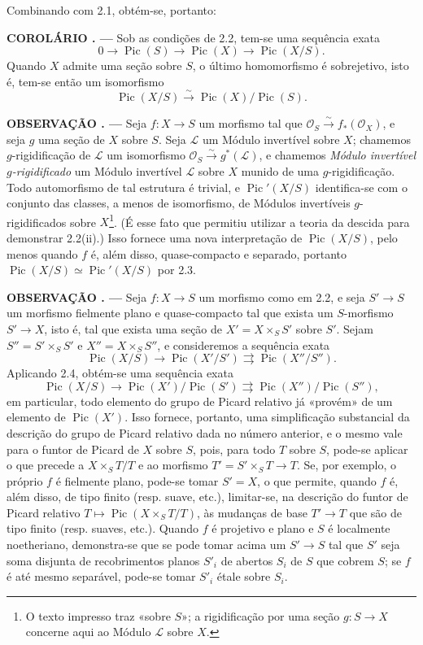 \documentclass[11pt,twoside,openany]{book}
\numberwithin{equation}{section}
\newcommand{\src}[1]{%
  \phantomsection\hypertarget{src:#1}{}%
  \marginpar{\raggedleft\footnotesize\sffamily #1}%
}
\theoremstyle{plain}
\theoremstyle{definition}
\theoremstyle{remark}
\newcommand{\result}[2]{%
  \par\medskip\noindent\textbf{#1%
  \if\relax\detokenize{#2}\relax\else\space#2\fi. ---}\enspace
}
\newcommand{\FgaUnitKey}{frontmatter}
\renewcommand{\src}[1]{%
  \phantomsection\hypertarget{src:\FgaUnitKey:#1}{}%
  \marginpar{\raggedleft\footnotesize\sffamily #1}%
}
\begin{document}
Combinando com 2.1, obtém-se, portanto:

\result{COROLÁRIO}{2.4} Sob as condições de 2.2, tem-se uma sequência exata
\[
0\longrightarrow\operatorname{Pic}(S)\longrightarrow\operatorname{Pic}(X)
\longrightarrow\operatorname{Pic}(X/S).
\]
Quando $X$ admite uma seção sobre $S$, o último homomorfismo é sobrejetivo,
isto é, tem-se então um isomorfismo
\[
\operatorname{Pic}(X/S)\xrightarrow{\sim}
\operatorname{Pic}(X)/\operatorname{Pic}(S).
\]

\result{OBSERVAÇÃO}{2.5} Seja $f:X\longrightarrow S$ um morfismo tal que
$\mathcal O_S\xrightarrow{\sim}f_*(\mathcal O_X)$, e seja $g$ uma seção de
$X$ sobre $S$. Seja $\mathcal L$ um Módulo invertível sobre $X$; chamemos
$g$-rigidificação de $\mathcal L$ um isomorfismo
$\mathcal O_S\xrightarrow{\sim}g^*(\mathcal L)$, e chamemos \emph{Módulo
invertível $g$-rigidificado} um Módulo invertível $\mathcal L$ sobre $X$ munido
de uma $g$-rigidificação. Todo automorfismo de tal estrutura é trivial, e
$\operatorname{Pic}'(X/S)$ identifica-se com o conjunto das classes, a menos de
isomorfismo, de Módulos invertíveis $g$-rigidificados sobre $X$\footnote{O
texto impresso traz «sobre $S$»; a rigidificação por uma seção $g:S\to X$
concerne aqui ao Módulo $\mathcal L$ sobre $X$.}. (É esse fato que permitiu
utilizar a teoria da descida para demonstrar 2.2(ii).) Isso fornece uma nova
interpretação de $\operatorname{Pic}(X/S)$, pelo menos quando $f$ é, além disso,
quase-compacto e separado, portanto
$\operatorname{Pic}(X/S)\simeq\operatorname{Pic}'(X/S)$ por 2.3.
\src{148}
\result{OBSERVAÇÃO}{2.6} Seja $f:X\longrightarrow S$ um morfismo como em
2.2, e seja $S'\longrightarrow S$ um morfismo fielmente plano e
quase-compacto tal que exista um $S$-morfismo $S'\longrightarrow X$, isto é,
tal que exista uma seção de $X'=X\times_SS'$ sobre $S'$. Sejam
$S''=S'\times_SS'$ e $X''=X\times_SS''$, e consideremos a sequência exata
\[
\operatorname{Pic}(X/S)\longrightarrow\operatorname{Pic}(X'/S')
\rightrightarrows\operatorname{Pic}(X''/S'').
\]
Aplicando 2.4, obtém-se uma sequência exata
\[
\operatorname{Pic}(X/S)\longrightarrow
\operatorname{Pic}(X')/\operatorname{Pic}(S')
\rightrightarrows
\operatorname{Pic}(X'')/\operatorname{Pic}(S''),
\]
em particular, todo elemento do grupo de Picard relativo já «provém» de um
elemento de $\operatorname{Pic}(X')$. Isso fornece, portanto, uma simplificação
substancial da descrição do grupo de Picard relativo dada no número anterior,
e o mesmo vale para o funtor de Picard de $X$ sobre $S$, pois, para todo $T$
sobre $S$, pode-se aplicar o que precede a $X\times_ST/T$ e ao morfismo
$T'=S'\times_ST\longrightarrow T$. Se, por exemplo, o próprio $f$ é fielmente
plano, pode-se tomar $S'=X$, o que permite, quando $f$ é, além disso, de tipo
finito (resp. suave, etc.), limitar-se, na descrição do funtor de Picard relativo
$T\longmapsto\operatorname{Pic}(X\times_ST/T)$, às mudanças de base
$T'\longrightarrow T$ que são de tipo finito (resp. suaves, etc.). Quando $f$
é projetivo e plano e $S$ é localmente noetheriano, demonstra-se que se pode
tomar acima um $S'\longrightarrow S$ tal que $S'$ seja soma disjunta de
recobrimentos planos $S'_i$ de abertos $S_i$ de $S$ que cobrem $S$; se $f$ é
até mesmo separável, pode-se tomar $S'_i$ étale sobre $S_i$.
\end{document}
